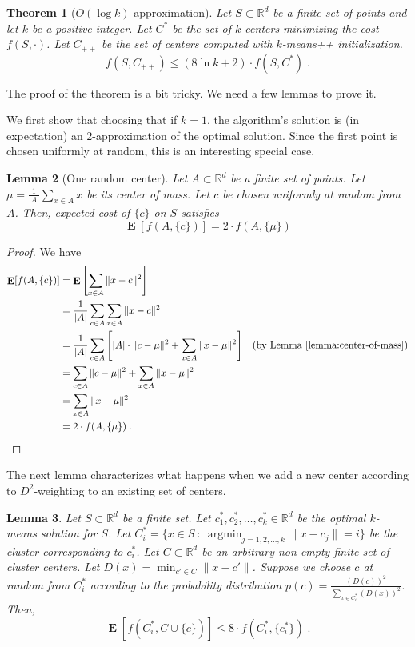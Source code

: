 \documentclass{article}
\newtheorem{lemma}{Lemma}
\newtheorem{theorem}[lemma]{Theorem}
\newcommand{\R}{\mathbb{R}}
\newcommand{\norm}[1]{\|{#1}\|}
\DeclareMathOperator*{\argmin}{argmin}
\DeclareMathOperator*{\Exp}{\mathbf{E}}
\begin{document}
\begin{theorem}[$O(\log k)$ approximation]
\label{theorem:main}
Let $S \subset \R^d$ be a finite set of points and let $k$ be a positive integer.
Let $C^*$ be the set of $k$ centers minimizing the cost $f(S,\cdot)$.
Let $C_{++}$ be the set of centers computed with $k$-means++ initialization.
$$
f(S, C_{++}) \le (8 \ln k + 2) \cdot f(S, C^*) \; .
$$
\end{theorem}

The proof of the theorem is a bit tricky. We need a few lemmas to prove it.

We first show that choosing that if $k=1$, the algorithm's solution is (in
expectation) an $2$-approximation of the optimal solution. Since the first point
is chosen uniformly at random, this is an interesting special case.

\begin{lemma}[One random center]
\label{lemma:one-random-center}
Let $A \subset \R^d$ be a finite set of points. Let $\mu = \frac{1}{|A|} \sum_{x \in A} x$
be its center of mass. Let $c$ be chosen uniformly at random from $A$. Then,
expected cost of $\{c\}$ on $S$ satisfies
$$
\Exp[f(A,\{c\})] = 2 \cdot f(A, \{\mu\})
$$
\end{lemma}

\begin{proof}
We have
\begin{align*}
\Exp[f(A,\{c\})]
& = \Exp\left[\sum_{x \in A} \norm{x - c}^2\right] \\
& = \frac{1}{|A|} \sum_{c \in A} \sum_{x \in A} \norm{x - c}^2 \\
& = \frac{1}{|A|} \sum_{c \in A} \left[ |A| \cdot \norm{c - \mu}^2 + \sum_{x \in A} \norm{x - \mu}^2 \right] & \text{(by Lemma~\ref{lemma:center-of-mass})} \\
& = \sum_{c \in A} \norm{c - \mu}^2 + \sum_{x \in A} \norm{x - \mu}^2 \\
& = \sum_{x \in A} \norm{x - \mu}^2 \\
& = 2 \cdot f(A, \{\mu\}) \; .
\end{align*}
\end{proof}

The next lemma characterizes what happens when we add a new center
according to $D^2$-weighting to an existing set of centers.

\begin{lemma}
Let $S \subset \R^d$ be a finite set. Let $c^*_1, c^*_2, \dots, c^*_k \in \R^d$
be the optimal $k$-means solution for $S$. Let $C^*_i = \{ x \in S ~:~
\argmin_{j=1,2,\dots,k} \norm{x - c_j} = i\}$ be the cluster corresponding to
$c^*_i$. Let $C \subset \R^d$ be an arbitrary non-empty finite set of cluster centers.
Let $D(x) = \min_{c' \in C} \norm{x - c'}$. Suppose we
choose $c$ at random from $C^*_i$ according to the probability distribution $p(c) =
\frac{(D(c))^2}{\sum_{x \in C_i^*} (D(x))^2}$. Then,
$$
\Exp[f(C_i^*, C \cup \{c\})] \le 8 \cdot f(C^*_i, \{c^*_i\}) \; .
$$
\end{lemma}
\end{document}
